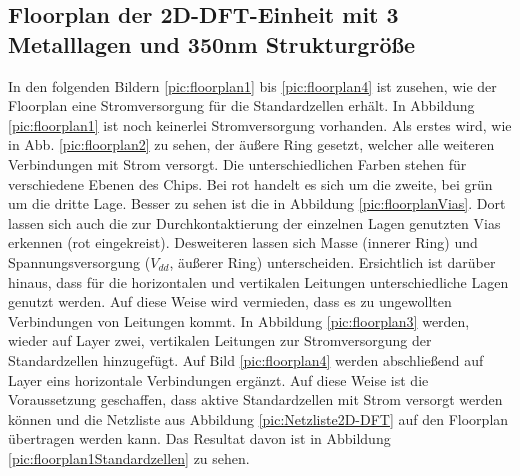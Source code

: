  \subsection{Floorplan der 2D-DFT-Einheit mit 3 Metalllagen und 350nm Strukturgröße}
 
  In den folgenden Bildern \ref{pic:floorplan1} bis \ref{pic:floorplan4} ist zusehen, wie der Floorplan eine Stromversorgung für die Standardzellen erhält. 
  In Abbildung \ref{pic:floorplan1} ist noch keinerlei Stromversorgung vorhanden. Als erstes wird, wie in Abb. \ref{pic:floorplan2} zu sehen, der äußere Ring gesetzt, welcher alle weiteren
  Verbindungen mit Strom versorgt. Die unterschiedlichen Farben stehen für verschiedene Ebenen des Chips. Bei rot handelt es sich um die zweite, bei grün um 
  die dritte Lage. Besser zu sehen ist die in Abbildung \ref{pic:floorplanVias}. Dort lassen sich auch die zur Durchkontaktierung der einzelnen Lagen genutzten 
  Vias erkennen (rot eingekreist). Desweiteren lassen sich Masse (innerer Ring) und Spannungsversorgung ($V_{dd}$, äußerer Ring) unterscheiden.
  Ersichtlich ist darüber hinaus, dass für die horizontalen und vertikalen Leitungen unterschiedliche Lagen genutzt werden. Auf diese Weise wird vermieden, 
  dass es zu ungewollten Verbindungen von Leitungen kommt.
  In Abbildung \ref{pic:floorplan3} werden, wieder auf Layer zwei, vertikalen Leitungen zur Stromversorgung der Standardzellen hinzugefügt. Auf Bild \ref{pic:floorplan4} werden abschließend auf 
  Layer eins horizontale Verbindungen ergänzt. Auf diese Weise ist die Voraussetzung geschaffen, dass aktive Standardzellen mit Strom versorgt werden können und
  die Netzliste aus Abbildung \ref{pic:Netzliste2D-DFT} auf den Floorplan übertragen werden kann. Das Resultat davon ist in Abbildung \ref{pic:floorplan1Standardzellen}
  zu sehen. 
  
